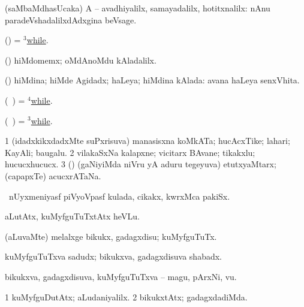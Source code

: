\bentry
{} 
\gl{\kirxvi}
\expl{}
\bmng
(saMbaMdhasUcaka) A -- avadhiyalilx, samayadalilx, hotitxnalilx:  nAnu paradeVshadalilxdAdxgina beVsage. 
\emng
\eentry

\bentry
{} 
\gl{\saMavayx}
\expl{}
\bmng
(\pArxparx) = \hyperlink{while(3)}{$^3$while}. 
\emng
\eentry

\bentry
{} 
\gl{\kirxvi}
\expl{}
\bmng
(\pArxparx) hiMdomemx; oMdAnoMdu kAladalilx. 
\emng
\eentry

\bentry
{} 
\gl{\gu}
\expl{}
\bmng
(\pArxparx) hiMdina; hiMde Agidadx; haLeya; hiMdina kAlada:  avana haLeya senxVhita. 
\emng
\eentry

\bentry
{} 
\gl{\kirxvi}
\expl{}
\bmng
(\kanmu\ \birx) = \hyperlink{while(4)}{$^4$while}. 
\emng
\eentry

\bentry
{} 
\gl{\saMavayx}
\expl{}
\bmng
(\kanmu\ \birx) = \hyperlink{while(3)}{$^3$while}. 
\emng
\eentry

\bentry 
{} 
\gl{\nA}
\expl{}
\bmng
\bnum
\num{1} (idadxkikxdadxMte suPxrisuva) manasisxna koMkATa; hucAcxTike; lahari; KayAli; baugalu. 
\num{2} vilakaSxNa kalapxne; vicitarx BAvane; tikakxlu; hucucxhucucx. 
\num{3} (\pArxparx) (gaNiyiMda niVru yA aduru tegeyuva) etutxyaMtarx; (capapxTe) acucxrATaNa. 
\enum
\emng
\eentry

\bentry
{} 
\gl{\nA}
\expl{}
\bmng
\kanmu\ nUyxmeniyasf piVyoVpasf kulada, cikakx, kwrxMca pakiSx. 
\emng
\eentry

\bentry
{} 
\gl{\sakirx}
\expl{}
\bmng
aLutAtx, kuMyfguTuTxtAtx heVLu. 
\emng

\noindent 
\gl{\akirx}
\expl{}
\bmng
(aLuvaMte) melalxge bikukx, gadagxdisu; kuMyfguTuTx. 
\emng
\eentry

\bentry
{} 
\gl{\nA}
\expl{}
\bmng
kuMyfguTuTxva sadudx; bikukxva, gadagxdisuva shabadx. 
\emng
\eentry

\bentry
{} 
\gl{\nA}
\bmng
bikukxva, gadagxdisuva, kuMyfguTuTxva -- magu, pArxNi, \mo vu. 
\emng
\eentry

\bentry
{} 
\gl{\kirxvi}
\expl{}
\bmng
\bnum
\num{1} kuMyfguDutAtx; aLudaniyalilx. 
\num{2} bikukxtAtx; gadagxdadiMda. 
\enum
\emng
\eentry

